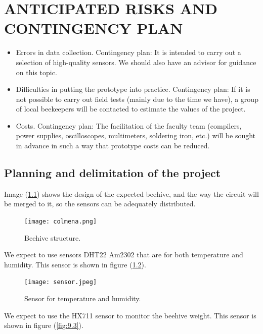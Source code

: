 \documentclass[12pt]{report}
\begin{document}
	\pagebreak
	\chapter{ANTICIPATED RISKS AND CONTINGENCY PLAN}
	\begin{itemize}
		\item Errors in data collection.
		\subitem Contingency plan: It is intended to carry out a selection of high-quality sensors. We should also have an advisor for guidance on this topic.
		\item Difficulties in putting the prototype into practice.
		\subitem Contingency plan: If it is not possible to carry out field tests (mainly due to the time we have), a group of local beekeepers will be contacted to estimate the values of the project.
		\item Costs.
		\subitem Contingency plan: The facilitation of the faculty team (compilers, power supplies, oscilloscopes, multimeters, soldering iron, etc.) will be sought in advance in such a way that prototype costs can be reduced.
	\end{itemize}
	
	\section{Planning and delimitation of the project}
	Image (\ref{fig:9.1}) shows the design of the expected beehive, and the way the circuit will be merged to it, so the sensors can be adequately distributed.
	
	\begin{figure}
		\centering
		\texttt{[image: colmena.png]}
		\caption{Beehive structure.}
		\label{fig:9.1}
	\end{figure}
	
	We expect to use sensors DHT22 Am2302 that are for both temperature and humidity. This sensor is shown in figure (\ref{fig:9.2}).
	
	\begin{figure}
		\centering
		\texttt{[image: sensor.jpeg]}
		\caption{Sensor for temperature and humidity.}
		\label{fig:9.2}
	\end{figure}
	
	We expect to use the HX711 sensor to monitor the beehive weight. This sensor is shown in figure (\ref{fig:9.3}).
	
\end{document}
